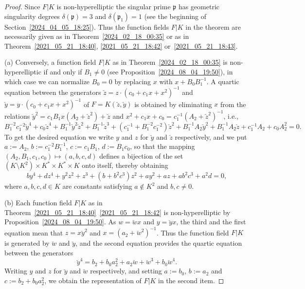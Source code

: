 \documentclass[12pt,reqno]{amsart}
\newcommand{\tode}[2][]{\todo[color=green!50, #1]{#2}} %
\newcommand{\todee}[2][]{\todo[color=yellow, #1]{#2}} %
\theoremstyle{definition}
\newcommand{\pp}{\mathfrak{p}}
\newcommand{\de}{\delta}
\begin{document}
\begin{proof}
Since $F|K$ is non-hyperelliptic the singular prime $\pp$ has geometric singularity degrees $\de(\pp)=3$ and $\de(\pp_1)=1$ (see the beginning of Section~\ref{2024_04_05_18:25}).
Thus the function fields $F|K$ in the theorem are necessarily given as in Theorem~\ref{2024_02_18_00:35} or as in Theorem~\ref{2021_05_21_18:40}, \ref{2021_05_21_18:42} or~\ref{2021_05_21_18:43}.

(a) Conversely, a function field $F|K$ as in Theorem~\ref{2024_02_18_00:35}
is non-hyperelliptic if and only if $B_1\neq 0$ (see Proposition~\ref{2024_08_04_19:50}), in which case we can normalize $B_0=0$ by replacing $x$ with $x + B_0 B_1^{-1}$.
A quartic equation between the generators $\breve z = z \cdot (c_0 + c_1 x + x^2)^{-1}$ and $\breve y = y \cdot (c_0 + c_1 x + x^2)^{-1}$ of $F=K(\breve z,\breve y)$ is obtained by eliminating $x$ from the relations $\breve y^2 = c_1 B_1 x (A_2 + \breve z^2) + \breve z$ and $x^2 + c_1 x + c_0 = c_1^{-1}(A_2 + \breve z^2)^{-1}$, i.e.,
\[ B_1^{-2} c_1^{-2} \breve y^4 + c_0 \breve z^4 + B_1^{-1} \breve y^2 \breve z^2 + B_1^{-1}\breve z^3 + (c_1^{-1} + B_1^{-2} c_1^{-2}) \breve z^2 + B_1^{-1} A_2 \breve y^2 + B_1^{-1} A_2 \breve z + c_1^{-1} A_2 + c_0 A_2^2 = 0. \]
To get the desired equation we write $y$ and $z$ for $\breve y$ and $\breve z$ respectively, and we put $a:= A_2$, $b:= c_1^{-2} B_1^{-1}$, $c:= c_1 B_1$, $d:= B_1 c_0$, so that the mapping $(A_2,B_1,c_1,c_0) \mapsto (a,b,c,d)$ defines a bijection of the set $(K\setminus K^2)\times K^* \times  K^* \times K$ onto itself, thereby obtaining
\[ b y^4 + d z^4 + y^2 z^2 + z^3 + (b + b^2 c^3) z^2 + a y^2 + a z + a b^2 c^3 + a^2 d = 0, \]
where $a,b,c,d \in K$ are constants satisfying $a \notin K^2$ and $b,c\neq 0$.

(b)
Each function field $F|K$ as in Theorem~\ref{2021_05_21_18:40}~\ref{2021_05_21_18:42} is non-hyperelliptic by Proposition~\ref{2024_08_04_19:50}.
As $w= \breve w x$ and $y = \breve y x$, the third and the first equation mean that $z = x \breve y^2$ and $x = (a_2 + \breve w^2)^{-1}$. Thus the function field $F|K$ is generated by $\breve w$ and $\breve y$, and the second equation provides the quartic equation between the generators
\[ \breve y^4 = b_2 + b_0 a_2^2 + a_2 \breve w + \breve w^3 + b_0 \breve w^4. \]
Writing $y$ and $z$ for $\breve y$ and $\breve w$ respectively, and setting $a:=b_0$, $b:=a_2$ and $c:=b_2+b_0 a_2^2$, we obtain the representation of $F|K$ in the second item.


\end{proof}
\end{document}
